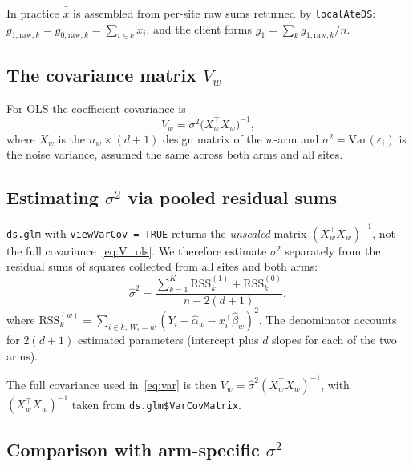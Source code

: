 \documentclass[11pt, a4paper]{article}
\newcommand{\Var}{\mathrm{Var}}
\newcommand{\xt}{\tilde{x}}
\newcommand{\hbeta}{\hat{\beta}}
\newcommand{\halpha}{\hat{\alpha}}
\newcommand{\hsigma}{\hat{\sigma}}
\begin{document}
In practice $\bar{\xt}$ is assembled from per-site raw sums returned by
\texttt{localAteDS}: $g_{1,\text{raw},k} = g_{0,\text{raw},k} = \sum_{i \in k}\xt_i$,
and the client forms $g_1 = \sum_k g_{1,\text{raw},k}/n$.

\subsection{The covariance matrix $V_w$}

For OLS the coefficient covariance is
\begin{equation}\label{eq:V_ols}
  V_w = \sigma^2 \bigl(X_w^\top X_w\bigr)^{-1},
\end{equation}
where $X_w$ is the $n_w \times (d+1)$ design matrix of the $w$-arm and
$\sigma^2 = \Var(\varepsilon_i)$ is the noise variance, assumed the same across
both arms and all sites.

\subsection{Estimating $\sigma^2$ via pooled residual sums}\label{sec:pooled}

\texttt{ds.glm} with \texttt{viewVarCov = TRUE} returns the
\emph{unscaled} matrix $(X_w^\top X_w)^{-1}$, not the full covariance~\eqref{eq:V_ols}.
We therefore estimate $\sigma^2$ separately from the residual sums of squares
collected from all sites and both arms:
\begin{equation}\label{eq:sigma2}
  \hsigma^2
    = \frac{\displaystyle\sum_{k=1}^K \mathrm{RSS}_k^{(1)} + \mathrm{RSS}_k^{(0)}}
           {n - 2(d+1)},
\end{equation}
where $\mathrm{RSS}_k^{(w)} = \sum_{i \in k,\, W_i=w}(Y_i - \halpha_w - x_i^\top\hbeta_w)^2$.
The denominator accounts for $2(d+1)$ estimated parameters (intercept plus $d$
slopes for each of the two arms).

The full covariance used in~\eqref{eq:var} is then
$V_w = \hsigma^2 (X_w^\top X_w)^{-1}$,
with $(X_w^\top X_w)^{-1}$ taken from \texttt{ds.glm\$VarCovMatrix}.

\subsection{Comparison with arm-specific $\sigma^2$}
\end{document}
